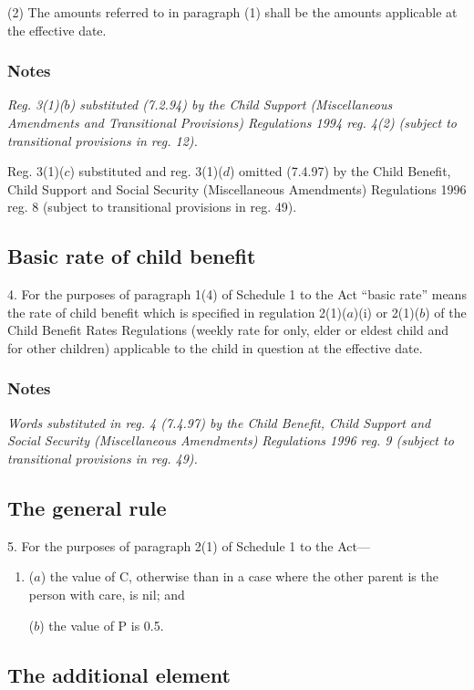 \documentclass[a4paper]{article}
\newcommand\amendment[1]{\subsubsection*{Notes}{\itshape\frenchspacing\footnotesize #1 \par\goodbreak}}
\begin{document}
(2) The amounts referred to in paragraph (1) shall be the amounts applicable at the effective date.

\amendment{
Reg. 3(1)($b$) substituted (7.2.94) by the Child Support (Miscellaneous Amendments and Transitional Provisions) Regulations 1994 reg. 4(2) (subject to transitional provisions in reg. 12).

Reg. 3(1)($c$) substituted and reg. 3(1)($d$) omitted (7.4.97) by the Child Benefit, Child Support and Social Security (Miscellaneous Amendments) Regulations 1996 reg. 8 (subject to transitional provisions in reg. 49).
}

\subsection[4. Basic rate of child benefit]{Basic rate of child benefit}

4.  For the purposes of paragraph 1(4) of Schedule 1 to the Act “basic rate” means the rate of child benefit which is specified in 
regulation 2(1)($a$)(i) or 2(1)($b$) of the Child Benefit Rates Regulations (weekly rate for only, elder or eldest child and for other children)  %
applicable to the child in question at the effective date.

\amendment{
Words substituted in reg. 4 (7.4.97) by the Child Benefit, Child Support and Social Security (Miscellaneous Amendments) Regulations 1996 reg. 9 (subject to transitional provisions in reg. 49).
}

\subsection[5. The general rule]{The general rule}

5.  For the purposes of paragraph 2(1) of Schedule 1 to the Act—
\begin{enumerate}\item[]
($a$) the value of C, otherwise than in a case where the other parent is the person with care, is nil; and

($b$) the value of P is 0.5.
\end{enumerate}

\subsection[6. The additional element]{The additional element}
\end{document}
